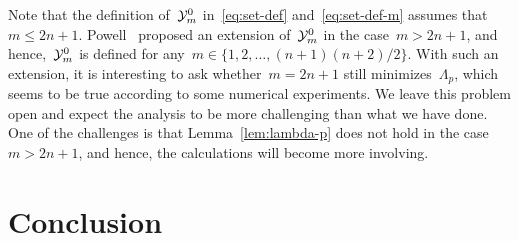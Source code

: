 \documentclass[draft]{article}
\numberwithin{equation}{section}
\theoremstyle{definition}
\theoremstyle{plain}
\newcommand{\set}[2][]{#1\{#2#1\}}
\newcommand{\xpt}[1][]{\mathcal{Y}\ifblank{#1}{}{^{#1}}}
\begin{document}
Note that the definition of~$\xpt[0]_m$ in~\eqref{eq:set-def} and~\eqref{eq:set-def-m} assumes that~$m \le 2n + 1$.
Powell~\cite{Powell_2006} proposed an extension of~$\xpt[0]_m$ in the case~$m > 2n + 1$, and hence,~$\xpt[0]_m$ is defined for any~$m \in \set{1, 2, \dots, (n + 1) (n + 2) / 2}$.
With such an extension, it is interesting to ask whether~$m = 2n + 1$ still minimizes~$\Lambda_p$, which seems to be true according to some numerical experiments.
We leave this problem open and expect the analysis to be more challenging than what we have done.
One of the challenges is that Lemma~\ref{lem:lambda-p} does not hold in the case~$m > 2n + 1$, and hence, the calculations will become more involving.

\section{Conclusion}




\end{document}
